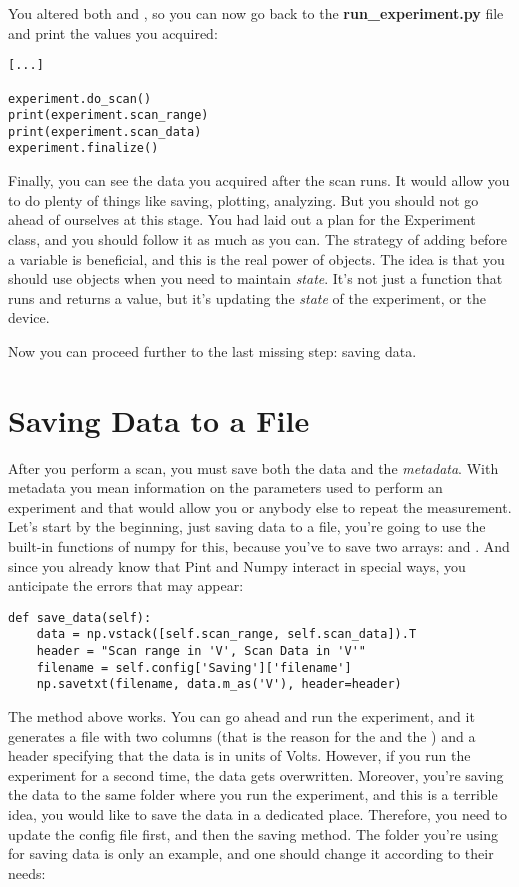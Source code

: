 You altered both  and , so you can now go back to the \textbf{run\_experiment.py} file and print the values you acquired:

\begin{verbatim}
[...]

experiment.do_scan()
print(experiment.scan_range)
print(experiment.scan_data)
experiment.finalize()
\end{verbatim}

Finally, you can see the data you acquired after the scan runs. It would allow you to do plenty of things like saving, plotting, analyzing. But you should not go ahead of ourselves at this stage. You had laid out a plan for the Experiment class, and you should follow it as much as you can. The strategy of adding  before a variable is beneficial, and this is the real power of objects. The idea is that you should use objects when you need to maintain \emph{state}. It's not just a function that runs and returns a value, but it's updating the \emph{state} of the experiment, or the device.

Now you can proceed further to the last missing step: saving data.

\section{Saving Data to a File}\label{sec:saving-data}
After you perform a scan, you must save both the data and the \emph{metadata}. With metadata you mean information on the parameters used to perform an experiment and that would allow you or anybody else to repeat the measurement. Let's start by the beginning, just saving data to a file, you're going to use the built-in functions of numpy for this, because you've to save two arrays:  and . And since you already know that Pint and Numpy interact in special ways, you anticipate the errors that may appear:

\begin{verbatim}
def save_data(self):
    data = np.vstack([self.scan_range, self.scan_data]).T
    header = "Scan range in 'V', Scan Data in 'V'"
    filename = self.config['Saving']['filename']
    np.savetxt(filename, data.m_as('V'), header=header)
\end{verbatim}

The method above works. You can go ahead and run the experiment, and it generates a file with two columns (that is the reason for the  and the ) and a header specifying that the data is in units of Volts. However, if you run the experiment for a second time, the data gets overwritten. Moreover, you're saving the data to the same folder where you run the experiment, and this is a terrible idea, you would like to save the data in a dedicated place. Therefore, you need to update the config file first, and then the saving method. The folder you're using for saving data is only an example, and one should change it according to their needs:

